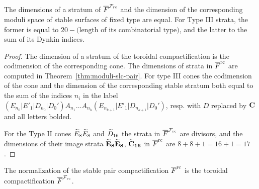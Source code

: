 \documentclass[table,x11names]{amsart}
\begin{document}
\begin{lemma}\label{diminput} 
  The dimensions of a stratum of ${\overline F}^{{\mathcal F}_{\rm rc}}$ and the dimension of
  the corresponding moduli space of stable surfaces of fixed type
  are equal. For Type III strata, the former is equal to
  $20-\text{(length of its combinatorial type)}$, and the latter to
  the sum of its Dynkin indices.
\end{lemma}


\begin{proof}
  The dimension of a stratum of the toroidal compactification is the
  codimension of the corresponding cone. The dimensions of strata in
  ${\overline F}^{{\rm rc}}$ are computed in Theorem~\ref{thm:moduli-slc-pair}.
  For type III cones the codimension of the cone and the dimension of
  the corresponding stable stratum both equal to the sum of the indices $n_i$
  in the label $(E_{n_0}|E'_1|D_{n_0}|D_0') A_{n_1}\dotsc
  A_{n_k}(E_{n_{k+1}}|E'_1|D_{n_{k+1}}|D_0')$, resp. with $D$ replaced
  by ${\bf C}$ and all letters bolded.

  

  For the Type II cones ${\widetilde E}_8{\widetilde E}_8$ and
  ${\widetilde D}_{16}$ the strata in
  ${\overline F}^{{\mathcal F}_{\rm rc}}$ are divisors, and the dimensions of their image strata
  ${\bf {\widetilde E}_8{\widetilde E}_8}$, ${\bf {\widetilde C}_{16}}$ in ${\overline F}^{{\rm rc}}$ are $8+8+1=16+1=17$.
\end{proof}

\begin{theorem}\label{thm:rc-comp}
  The normalization of the stable pair compactification ${\overline F}^{{\rm rc}}$ is
  the toroidal compactification ${\overline F}^{{\mathcal F}_{\rm rc}}$. 
\end{theorem}
\end{document}
